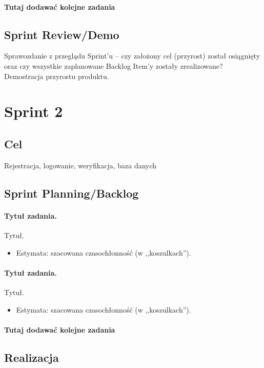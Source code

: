 \documentclass[a4paper]{article}
\begin{document}
\paragraph{Tutaj dodawać kolejne zadania}


\subsection{Sprint Review/Demo}
Sprawozdanie z przeglądu Sprint'u -- czy założony cel (przyrost) został osiągnięty oraz czy wszystkie zaplanowane Backlog Item'y zostały zrealizowane? Demostracja przyrostu produktu.

\section{Sprint 2}

\subsection{Cel} Rejestracja, logowanie, weryfikacja, baza danych 

\subsection{Sprint Planning/Backlog}

\paragraph{Tytuł zadania.} Tytuł.
\begin{itemize}
\item Estymata: szacowana czasochłonność (w ,,koszulkach'').
\end{itemize}

\paragraph{Tytuł zadania.} Tytuł.
\begin{itemize}
\item Estymata: szacowana czasochłonność (w ,,koszulkach'').
\end{itemize}

\paragraph{Tutaj dodawać kolejne zadania}

\subsection{Realizacja}
\end{document}
